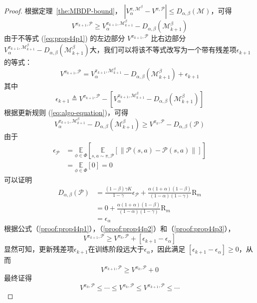 \begin{proof}

根据定理~\ref{the:MBDP-bound}， $\left|{V}_\alpha^{\pi, \mathcal{M}^\beta}-{V}^{\pi, \mathcal{P}}\right|\leq D_{\alpha,\beta}(\mathcal{M})$，可得
\begin{equation}\label{eq:prop44p1}
{V}^{\pi_{k+1}, \mathcal{P}} \geq {V}_{\alpha}^{\pi_{k+1}, \mathcal{M}_{k+1}^\beta}-D_{\alpha,\beta}(\mathcal{M}_{k+1}^\beta)
\end{equation}
由于不等式 (\ref{eq:prop44p1}) 的左边部分 ${V}^{\pi_{k+1}, \mathcal{P}}$ 比右边部分${V}_{\alpha}^{\pi_{k+1}, \mathcal{M}_{k+1}^\beta}-D_{\alpha,\beta}(\mathcal{M}_{k+1}^\beta)$大，我们可以将该不等式改写为一个带有残差项$\epsilon_{k+1}$的等式：
\begin{equation}\label{proof:prop44p1}
{V}^{\pi_{k+1}, \mathcal{P}} = {V}_{\alpha}^{\pi_{k+1}, \mathcal{M}_{k+1}^\beta}-D_{\alpha,\beta}(\mathcal{M}_{k+1}^\beta) + \epsilon_{k+1}
\end{equation}
其中
\begin{equation}
\epsilon_{k+1} \triangleq {V}^{\pi_{k+1}, \mathcal{P}} - \left[{V}_{\alpha}^{\pi_{k+1}, \mathcal{M}_{k+1}^\beta} - D_{\alpha,\beta}(\mathcal{M}_{k+1}^\beta)\right]
\end{equation}
根据更新规则 (\ref{eq:algo-equation})，可得
\begin{equation}\label{proof:prop44p2}
{V}_{\alpha}^{\pi_{k+1}, \mathcal{M}_{k+1}^\beta}-D_{\alpha,\beta}(\mathcal{M}_{k+1}^\beta) \geq {V}^{\pi_k,\mathcal{P}}-D_{\alpha,\beta}(\mathcal{P})
\end{equation}
由于
\begin{align}
\epsilon_{\mathcal{P}} &= \underset{\phi\in\Phi}{\mathbb{E}}\left[\underset{s,a\sim \pi,\mathcal{P}}{\mathbb{E}}\left[\left\|\mathcal{P}(s, a)-\mathcal{P}(s, a)\right\|\right]\right]\\
&=\underset{\phi\in\Phi}{\mathbb{E}}\left[0\right] = 0
\end{align}
可以证明
\begin{align}
D_{\alpha,\beta}(\mathcal{P}) &= \frac{(1-\beta)\gamma K}{1-\gamma}\epsilon_{\mathcal{P}}+\frac{\alpha(1+\alpha)(1-\beta)}{(1-\alpha)(1-\gamma)}\mathrm{R}_m\\
&=0+\frac{\alpha(1+\alpha)(1-\beta)}{(1-\alpha)(1-\gamma)}\mathrm{R}_m\\
&=\epsilon_\alpha \label{proof:prop44p3}
\end{align}
根据公式（\ref{proof:prop44p1}），（\ref{proof:prop44p2}）和（\ref{proof:prop44p3}），
\begin{equation}
{V}^{\pi_{k+1}, \mathcal{P}}\geq {V}^{\pi_{k}, \mathcal{P}} + \left[\epsilon_{k+1} - \epsilon_\alpha\right]
\end{equation}
显然可知，更新残差项$\epsilon_{k+1}$在训练阶段远大于$\epsilon_\alpha$，因此满足 $\left[\epsilon_{k+1} - \epsilon_\alpha\right]\geq 0$，从而
\begin{equation}
{V}^{\pi_{k+1}, \mathcal{P}}\geq{V}^{\pi_{k}, \mathcal{P}}+0 
\end{equation}
最终证得
\begin{equation}
{V}^{\pi_{0}, \mathcal{P}} \leq \cdots \leq {V}^{\pi_{k}, \mathcal{P}} \leq {V}^{\pi_{k+1}, \mathcal{P}} \leq \cdots
\end{equation}


\end{proof}
